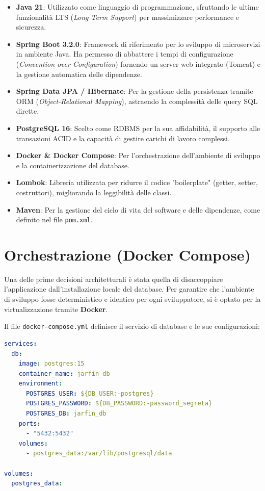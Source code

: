 \begin{itemize}
    \item \textbf{Java 21}: Utilizzato come linguaggio di programmazione, sfruttando le ultime funzionalità LTS (\textit{Long Term Support}) per massimizzare performance e sicurezza.
    \item \textbf{Spring Boot 3.2.0}: Framework di riferimento per lo sviluppo di microservizi in ambiente Java. Ha permesso di abbattere i tempi di configurazione (\textit{Convention over Configuration}) fornendo un server web integrato (Tomcat) e la gestione automatica delle dipendenze.
    \item \textbf{Spring Data JPA / Hibernate}: Per la gestione della persistenza tramite ORM (\textit{Object-Relational Mapping}), astraendo la complessità delle query SQL dirette.
    \item \textbf{PostgreSQL 16}: Scelto come RDBMS per la sua affidabilità, il supporto alle transazioni ACID e la capacità di gestire carichi di lavoro complessi.
    \item \textbf{Docker \& Docker Compose}: Per l'orchestrazione dell'ambiente di sviluppo e la containerizzazione del database.
    \item \textbf{Lombok}: Libreria utilizzata per ridurre il codice "boilerplate" (getter, setter, costruttori), migliorando la leggibilità delle classi.
    \item \textbf{Maven}: Per la gestione del ciclo di vita del software e delle dipendenze, come definito nel file \texttt{pom.xml}.
\end{itemize}

\section{Orchestrazione (Docker Compose)}

Una delle prime decisioni architetturali è stata quella di disaccoppiare l'applicazione dall'installazione locale del database. Per garantire che l'ambiente di sviluppo fosse deterministico e identico per ogni sviluppatore, si è optato per la virtualizzazione tramite \textbf{Docker}.

\newpage

Il file \texttt{docker-compose.yml} definisce il servizio di database e le sue configurazioni:

\bigskip

\begin{lstlisting}[language=yaml, label={lst:dockercompose}]
services:
  db:
    image: postgres:15
    container_name: jarfin_db
    environment:
      POSTGRES_USER: ${DB_USER:-postgres}
      POSTGRES_PASSWORD: ${DB_PASSWORD:-password_segreta}
      POSTGRES_DB: jarfin_db
    ports:
      - "5432:5432"
    volumes:
      - postgres_data:/var/lib/postgresql/data

volumes:
  postgres_data:
\end{lstlisting}

